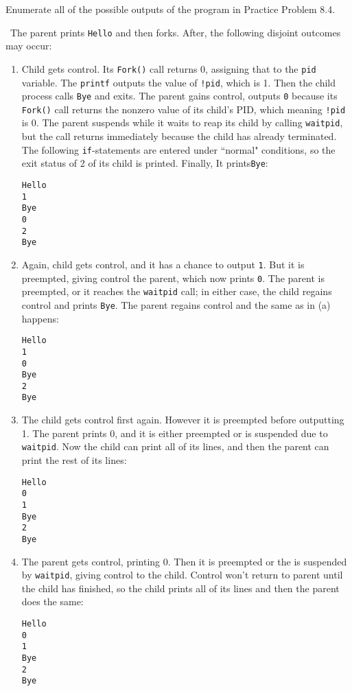 \documentclass[12pt]{article}
\newenvironment{ex}[2][Exercise]{\begin{trivlist}
		\item[\hskip \labelsep {\bfseries #1}\hskip \labelsep {\bfseries #2.}]}{\end{trivlist}}
\newenvironment{sol}[1][Solution]{\begin{trivlist}
		\item[\hskip \labelsep {\bfseries #1:}]}{\end{trivlist}}
\begin{document}
\begin{ex}{8.17}
	Enumerate all of the possible outputs of the program in Practice Problem 8.4.
\end{ex}

\begin{sol}
	\
	The parent prints \texttt{Hello} and then forks. After, the following disjoint outcomes may
	occur:
	\begin{enumerate}[label=(\alph*)]
		\item Child gets control. Its \texttt{Fork()} call returns 0, assigning that to the
		\texttt{pid} variable. The \texttt{printf} outputs the value of \texttt{!pid}, which
		is 1. Then the child process calls \texttt{Bye} and exits. The parent gains control,
		outputs \texttt{0} because its \texttt{Fork()} call returns the nonzero value of its
		child's PID, which meaning \texttt{!pid} is 0. The parent suspends while it waits
		to reap its child by calling \texttt{waitpid}, but the call returns immediately because
		the child has already terminated. The following \texttt{if}-statements are entered
		under ``normal" conditions, so the exit status of 2 of its child is printed. Finally,
		It prints\texttt{Bye}:
		\begin{lstlisting}
Hello
1
Bye
0
2
Bye
		\end{lstlisting}
		\item Again, child gets control, and it has a chance to output \texttt{1}. But it is
		preempted, giving control the parent, which now prints \texttt{0}. The parent is preempted,
		or it reaches the \texttt{waitpid} call; in either case, the child regains control and prints
		\texttt{Bye}. The parent regains control and the same as in (a) happens:
		\begin{lstlisting}[language={}]
Hello
1
0
Bye
2
Bye
		\end{lstlisting}
		\item The child gets control first again. However it is preempted before outputting 1.
		The parent prints 0, and it is either preempted or is suspended due to \texttt{waitpid}.
		Now the child can print all of its lines, and then the parent can print the rest of its lines:
		\begin{lstlisting}[language={}]
Hello
0
1
Bye
2
Bye
		\end{lstlisting}
		\item The parent gets control, printing 0. Then it is preempted or the is suspended by
		\texttt{waitpid}, giving control to the child. Control won't return to parent until the
		child has finished, so the child prints all of its lines and then the parent does the same:
		\begin{lstlisting}[language={}]
Hello
0
1
Bye
2
Bye
		\end{lstlisting}
	\end{enumerate}
\end{sol}
\end{document}
